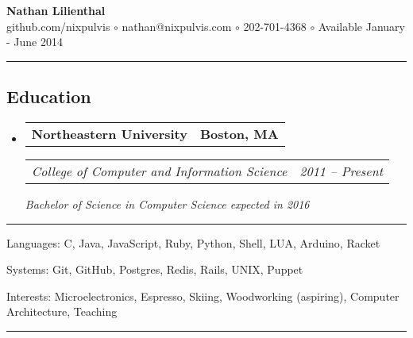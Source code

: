 \documentclass[10pt,letterpaper]{article}
\makeatletter
\newenvironment{indentsection}[1]
{\begin{list}{}
  {\setlength{\leftmargin}{#1}} \item[]
}
{\end{list}}
\newcommand{\headerrow}[2]
{\begin{tabular*}{\linewidth}{l@{\extracolsep{\fill}}r}
  #1 &
  #2 \\
\end{tabular*}}
\makeatother
\begin{document}
\begin{center}
  \huge \textbf{Nathan Lilienthal} \\
  \large
  github.com/nixpulvis
  $\circ$
  nathan@nixpulvis.com
  $\circ$
  202-701-4368
  $\circ$
  Available January - June 2014
  \vspace{-0.2em}
\end{center}

\hrule
\vspace{-0.4em}
\subsection*{Education}
\begin{itemize}
  \parskip=0.1em

  \item
  \headerrow
    {\textbf{Northeastern University}}
    {\textbf{Boston, MA}}
  \headerrow
    {\emph{College of Computer and Information Science}}
    {\emph{2011 -- Present}}
    {\emph{Bachelor of Science in Computer Science expected in 2016}}
\end{itemize}


\hrule
\begin{indentsection}{\parindent}
\begin{description*}
  \item[Languages:]
  C, Java, JavaScript, Ruby, Python, Shell, LUA, Arduino, Racket
  \item[Systems:]
  Git, GitHub, Postgres, Redis, Rails, UNIX, Puppet
  \item[Interests:]
  Microelectronics, Espresso, Skiing, Woodworking (aspiring), Computer Architecture, Teaching
\end{description*}
\end{indentsection}


\hrule
\vspace{-0.4em}
\end{document}
